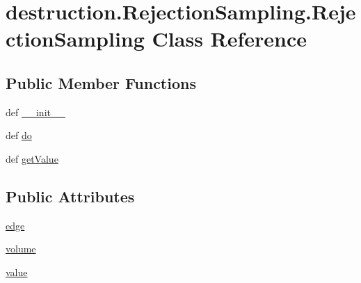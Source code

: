 \hypertarget{classdestruction_1_1_rejection_sampling_1_1_rejection_sampling}{\section{destruction.\-Rejection\-Sampling.\-Rejection\-Sampling Class Reference}
\label{classdestruction_1_1_rejection_sampling_1_1_rejection_sampling}
}
\subsection*{Public Member Functions}
\begin{DoxyCompactItemize}
\item 
def \hyperlink{classdestruction_1_1_rejection_sampling_1_1_rejection_sampling_abfd0c3b1ce40c182506fa74a61666e06}{\-\_\-\-\_\-init\-\_\-\-\_\-}
\item 
def \hyperlink{classdestruction_1_1_rejection_sampling_1_1_rejection_sampling_a6cee6e810b2c701748a1f0ab7bf607a2}{do}
\item 
def \hyperlink{classdestruction_1_1_rejection_sampling_1_1_rejection_sampling_ac910c69f03184f9e748441356c3db47e}{get\-Value}
\end{DoxyCompactItemize}
\subsection*{Public Attributes}
\begin{DoxyCompactItemize}
\item 
\hyperlink{classdestruction_1_1_rejection_sampling_1_1_rejection_sampling_a9ad2a1e7f3000562a06c41cdc18d0df6}{edge}
\item 
\hyperlink{classdestruction_1_1_rejection_sampling_1_1_rejection_sampling_a54f5fd7f337780a7763ef73d757bc001}{volume}
\item 
\hyperlink{classdestruction_1_1_rejection_sampling_1_1_rejection_sampling_aac80b0c198da797d0a07b0e6413920e3}{value}
\end{DoxyCompactItemize}



